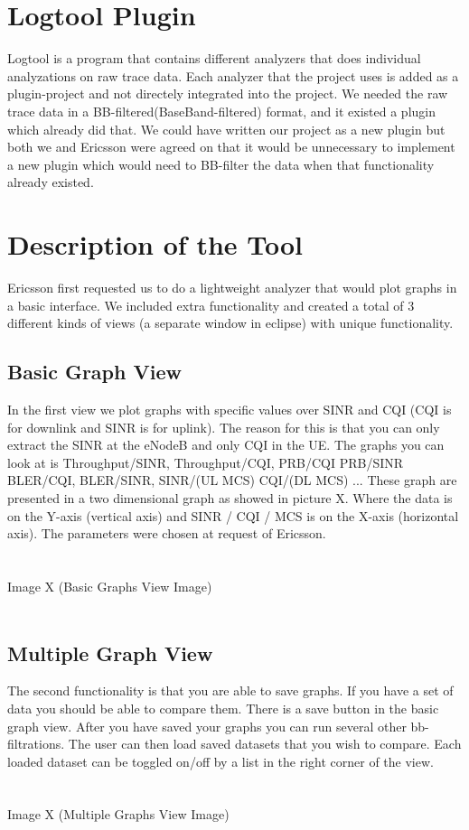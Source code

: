 \documentclass[cropmarks, frame, english]{idamasterthesis}
\begin{document}
\section{Logtool Plugin}
Logtool is a program that contains different analyzers that does individual analyzations on raw trace data. Each analyzer that the project uses is added as a plugin-project and not directely integrated into the project. We needed the raw trace data in a BB-filtered(BaseBand-filtered) format, and it existed a plugin which already did that. We could have written our project as a new plugin but both we and Ericsson were agreed on that it would be unnecessary to implement a new plugin which would need to BB-filter the data when that functionality already existed. 
 
\section{Description of the Tool}
Ericsson first requested us to do a lightweight analyzer that would plot graphs in a basic interface. We included extra functionality and created a total of 3 different kinds of views (a separate window in eclipse) with unique functionality. 

\subsection{Basic Graph View}
 In the first view we plot graphs with specific values over SINR and CQI (CQI is for downlink and SINR is for uplink). The reason for this is that you can only extract the SINR at the eNodeB and only CQI in the UE. The graphs you can look at is Throughput/SINR, Throughput/CQI, PRB/CQI PRB/SINR BLER/CQI, BLER/SINR, SINR/(UL MCS) CQI/(DL MCS) ... These graph are presented in a two dimensional graph as showed in picture X. Where the data is on the Y-axis (vertical axis) and SINR / CQI / MCS is on the X-axis (horizontal axis). The parameters were chosen at request of Ericsson. 
\\
\\ 
\\
		Image X (Basic Graphs View Image)
\\
\\

\subsection{Multiple Graph View}
The second functionality is that you are able to save graphs. If you have a set of data you should be able to compare them. There is a save button in the basic graph view. After you have saved your graphs you can run several other bb-filtrations. The user can then load saved datasets that you wish to compare. Each loaded dataset can be toggled on/off by a list in the right corner of the view.
\\
\\ 
\\
		Image X (Multiple Graphs View Image)
\\
\\
\end{document}
